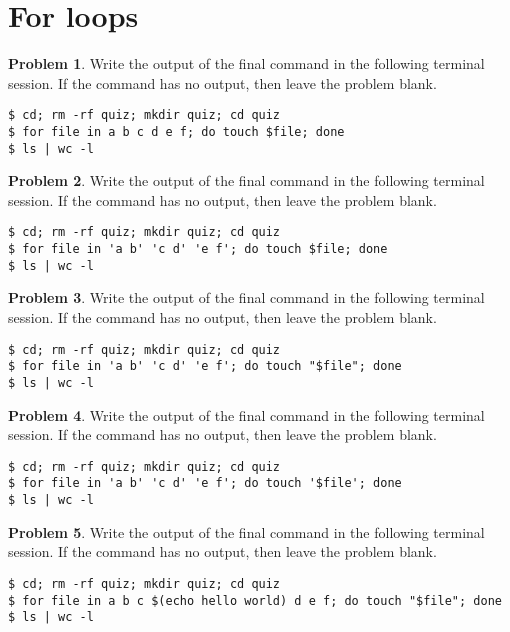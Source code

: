 \documentclass[10pt]{article}
\theoremstyle{definition}
\newtheorem{problem}{Problem}
\begin{document}
\section{For loops}

\filbreak\begin{problem}
    Write the output of the final command in the following terminal session.
    If the command has no output, then leave the problem blank.
\end{problem}
\begin{lstlisting}
$ cd; rm -rf quiz; mkdir quiz; cd quiz
$ for file in a b c d e f; do touch $file; done
$ ls | wc -l
\end{lstlisting}
\vspace{0.4in}

\filbreak\begin{problem}
    Write the output of the final command in the following terminal session.
    If the command has no output, then leave the problem blank.
\end{problem}
\begin{lstlisting}
$ cd; rm -rf quiz; mkdir quiz; cd quiz
$ for file in 'a b' 'c d' 'e f'; do touch $file; done
$ ls | wc -l
\end{lstlisting}
\vspace{0.4in}

\filbreak\begin{problem}
    Write the output of the final command in the following terminal session.
    If the command has no output, then leave the problem blank.
\end{problem}
\begin{lstlisting}
$ cd; rm -rf quiz; mkdir quiz; cd quiz
$ for file in 'a b' 'c d' 'e f'; do touch "$file"; done
$ ls | wc -l
\end{lstlisting}
\vspace{0.4in}

\filbreak\begin{problem}
    Write the output of the final command in the following terminal session.
    If the command has no output, then leave the problem blank.
\end{problem}
\begin{lstlisting}
$ cd; rm -rf quiz; mkdir quiz; cd quiz
$ for file in 'a b' 'c d' 'e f'; do touch '$file'; done
$ ls | wc -l
\end{lstlisting}
\vspace{0.4in}


\filbreak\begin{problem}
    Write the output of the final command in the following terminal session.
    If the command has no output, then leave the problem blank.
\end{problem}
\begin{lstlisting}
$ cd; rm -rf quiz; mkdir quiz; cd quiz
$ for file in a b c $(echo hello world) d e f; do touch "$file"; done
$ ls | wc -l
\end{lstlisting}
\vspace{0.4in}
\end{document}
